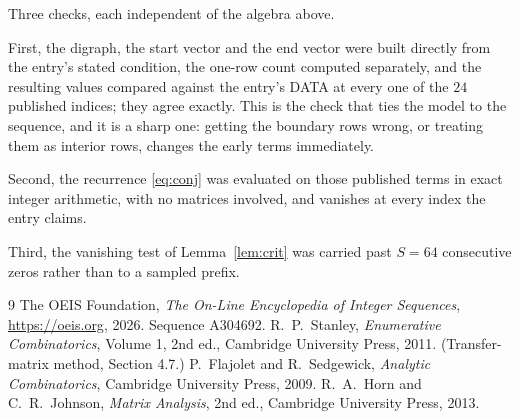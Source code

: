 \documentclass[11pt,a4paper]{article}
\theoremstyle{plain}
\theoremstyle{definition}
\begin{document}
Three checks, each independent of the algebra above.

First, the digraph, the start vector and the end vector were built directly from the
entry's stated condition, the one-row count computed separately, and the resulting values
compared against the entry's DATA at every one of the $24$ published indices; they
agree exactly. This is the check that ties the model to the sequence, and it is a sharp one:
getting the boundary rows wrong, or treating them as interior rows, changes the early terms
immediately.

Second, the recurrence \eqref{eq:conj} was evaluated on those published terms in exact
integer arithmetic, with no matrices involved, and vanishes at every index the entry claims.

Third, the vanishing test of Lemma~\ref{lem:crit} was carried past $S=64$ consecutive
zeros rather than to a sampled prefix.

\begin{thebibliography}{9}
 The OEIS Foundation, \emph{The On-Line Encyclopedia of Integer
Sequences}, \url{https://oeis.org}, 2026. Sequence A304692.
 R.~P.~Stanley, \emph{Enumerative Combinatorics}, Volume 1, 2nd ed.,
Cambridge University Press, 2011. (Transfer-matrix method, Section 4.7.)
 P.~Flajolet and R.~Sedgewick, \emph{Analytic Combinatorics}, Cambridge
University Press, 2009.
 R.~A.~Horn and C.~R.~Johnson, \emph{Matrix Analysis}, 2nd ed., Cambridge
University Press, 2013.
\end{thebibliography}
\end{document}
